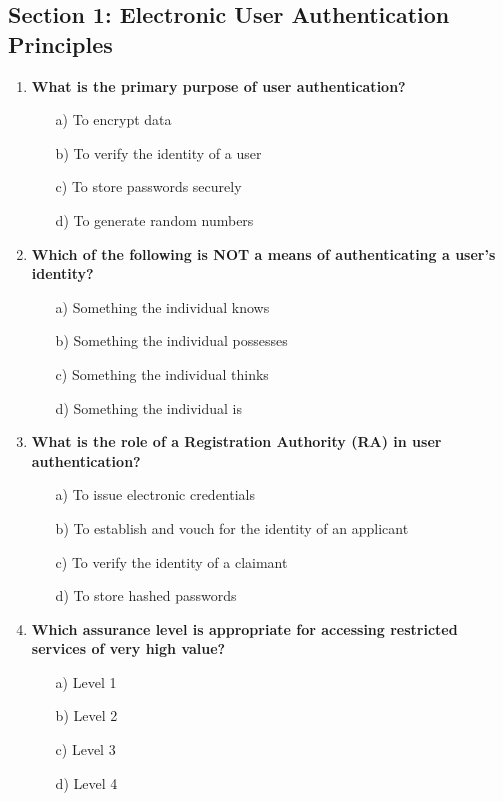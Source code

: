 \documentclass{article}
\begin{document}
\subsection*{Section 1: Electronic User Authentication Principles}
\begin{enumerate}
    \item \textbf{What is the primary purpose of user authentication?}
    \begin{itemize}
        \item[a)] To encrypt data  
        \item[b)] To verify the identity of a user  
        \item[c)] To store passwords securely  
        \item[d)] To generate random numbers  
    \end{itemize}

    \item \textbf{Which of the following is NOT a means of authenticating a user’s identity?}
    \begin{itemize}
        \item[a)] Something the individual knows  
        \item[b)] Something the individual possesses  
        \item[c)] Something the individual thinks  
        \item[d)] Something the individual is  
    \end{itemize}

    \item \textbf{What is the role of a Registration Authority (RA) in user authentication?}
    \begin{itemize}
        \item[a)] To issue electronic credentials  
        \item[b)] To establish and vouch for the identity of an applicant  
        \item[c)] To verify the identity of a claimant  
        \item[d)] To store hashed passwords  
    \end{itemize}

    \item \textbf{Which assurance level is appropriate for accessing restricted services of very high value?}
    \begin{itemize}
        \item[a)] Level 1  
        \item[b)] Level 2  
        \item[c)] Level 3  
        \item[d)] Level 4  
    \end{itemize}


\end{enumerate}
\end{document}
